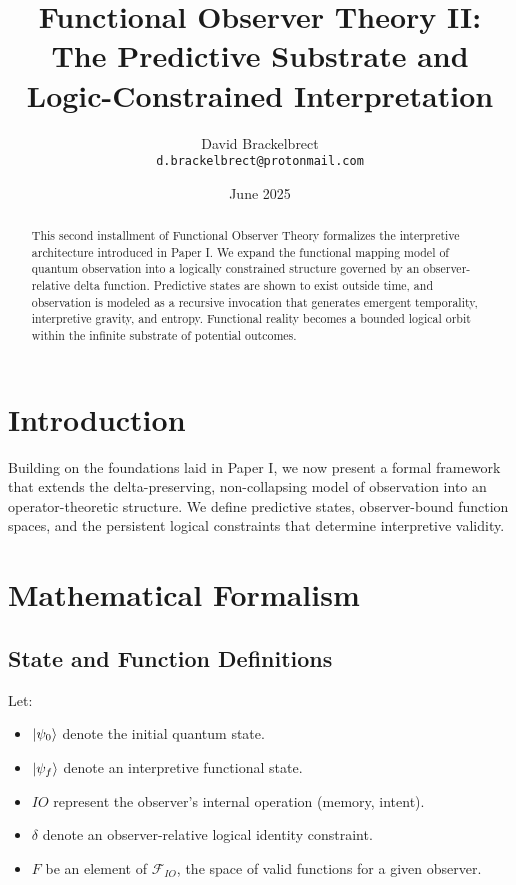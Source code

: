 \documentclass[12pt]{article}
\title{Functional Observer Theory II: The Predictive Substrate and Logic-Constrained Interpretation}
\author{David Brackelbrect\\ \texttt{d.brackelbrect@protonmail.com}}
\date{June 2025}
\begin{document}
\maketitle

\begin{abstract}
This second installment of Functional Observer Theory formalizes the interpretive architecture introduced in Paper I. We expand the functional mapping model of quantum observation into a logically constrained structure governed by an observer-relative delta function. Predictive states are shown to exist outside time, and observation is modeled as a recursive invocation that generates emergent temporality, interpretive gravity, and entropy. Functional reality becomes a bounded logical orbit within the infinite substrate of potential outcomes.
\end{abstract}

\section{Introduction}
Building on the foundations laid in Paper I, we now present a formal framework that extends the delta-preserving, non-collapsing model of observation into an operator-theoretic structure. We define predictive states, observer-bound function spaces, and the persistent logical constraints that determine interpretive validity.

\section{Mathematical Formalism}

\subsection{State and Function Definitions}
Let:
\begin{itemize}
    \item $\ket{\psi_0}$ denote the initial quantum state.
    \item $\ket{\psi_f}$ denote an interpretive functional state.
    \item $IO$ represent the observer’s internal operation (memory, intent).
    \item $\delta$ denote an observer-relative logical identity constraint.
    \item $F$ be an element of $\mathscr{F}_{IO}$, the space of valid functions for a given observer.
\end{itemize}
\end{document}
